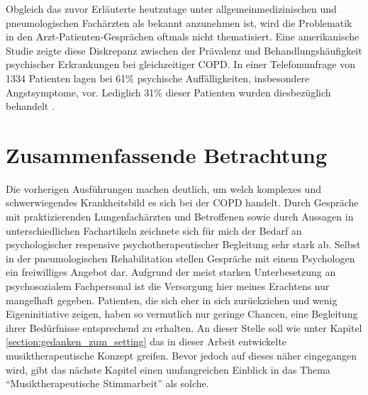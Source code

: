 Obgleich das zuvor Erläuterte heutzutage unter allgemeinmedizinischen und pneumologischen Fachärzten als bekannt anzunehmen ist, wird die Problematik in den Arzt-Patienten-Gesprächen oftmals nicht thematisiert. Eine amerikanische Studie zeigte diese Diskrepanz zwischen der Prävalenz und Behandlungshäufigkeit psychischer Erkrankungen bei gleichzeitiger COPD. In einer Telefonumfrage von 1334 Patienten lagen bei 61\% psychische Auffälligkeiten, insbesondere Angstsymptome, vor. Lediglich 31\% dieser Patienten wurden diesbezüglich behandelt \autocite[vgl.][156]{fischer2007}.


\section{Zusammenfassende Betrachtung}
\label{zusammenfassende betrachtung}
Die vorherigen Ausführungen machen deutlich, um welch komplexes und schwerwiegendes Krankheitsbild es sich bei der COPD handelt. 
Durch Gespräche mit praktizierenden Lungenfachärzten und Betroffenen sowie durch Aussagen in unterschiedlichen Fachartikeln zeichnete sich für mich der Bedarf an psychologischer respensive psychotherapeutischer Begleitung sehr stark ab. Selbst in der pneumologischen Rehabilitation stellen Gespräche mit einem Psychologen ein freiwilliges Angebot dar. Aufgrund der meist starken Unterbesetzung an psychosozialem Fachpersonal ist die Versorgung hier meines Erachtens nur mangelhaft gegeben. Patienten, die sich eher in sich zurückziehen und wenig Eigeninitiative zeigen, haben so vermutlich nur geringe Chancen, eine Begleitung ihrer Bedürfnisse entsprechend zu erhalten. An dieser Stelle soll wie unter Kapitel \ref{section:gedanken_zum_setting} das in dieser Arbeit entwickelte musiktherapeutische Konzept greifen. Bevor jedoch auf dieses näher eingegangen wird, gibt das nächste Kapitel einen umfangreichen Einblick in das Thema "`Musiktherapeutische Stimmarbeit"' als solche.

\newpage\thispagestyle{empty}